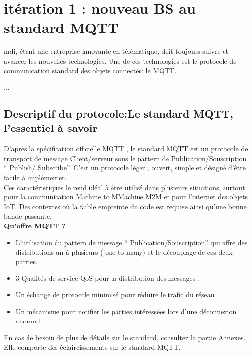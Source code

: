 \section{itération 1 : nouveau BS au standard MQTT}
        \gls{mdi}, étant une entreprise innovante en télématique, doit toujours
        suivre et avancer les nouvelles technologies. Une de ces technologies
        est le protocole de communication standard des objets connectés: le MQTT.

        ...
        


    \subsection{Descriptif du protocole:Le standard MQTT, l'essentiel à savoir}
    D’après la spécification officielle MQTT \cite{mqtt_site},
    le standard MQTT est un protocole de transport de message Client/serveur sous le pattern de Publication/Souscription 
    “ Publish/ Subscribe”. 
    C'est un protocole léger , ouvert, simple et désigné d’être facile à implémenter. \\
    Ces caractéristiques le rend idéal à être utilisé dans plusieurs situations, surtout pour la communication Machine 
    to MMachine M2M et pour l’internet des objets IoT. Des contextes où la faible empreinte du code est requise ainsi 
    qu’une bonne bande passante.     \\
    
    {
        \large 
        \centering
        \textbf{Qu’offre MQTT ? }\\
    
    }   
   
    \begin{itemize}
        \renewcommand{\labelitemi}{$\bullet$}
        \item L’utilisation du pattern de message “ Publication/Souscription” qui offre 
        des distributions un-à-plusieurs ( one-to-many) et le découplage de ces deux parties.    
        \item 3 Qualités de service QoS pour la distribution des messages . 
        \item Un échange de protocole minimisé pour réduire le trafic  du réseau      
        \item Un mécanisme pour notifier les parties intéressées lors d'une déconnexion anormal    
    \end{itemize}   
    \bigskip 
    En cas de besoin de plus de détails sur le standard, consultez la partie Annexes. Elle comporte des éclaircissements 
    sur le standard MQTT.\\


